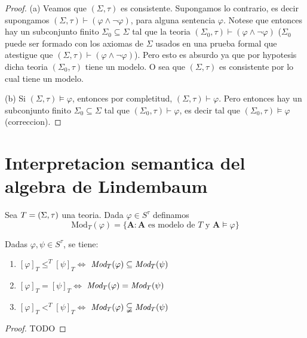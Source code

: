 \begin{proof}
  (a) Veamos que $(\Sigma ,\tau )$ es consistente. Supongamos lo contrario, es
decir supongamos $(\Sigma ,\tau )\vdash \left( \varphi \wedge \lnot \varphi
\right) $, para alguna sentencia $\varphi $. Notese que entonces hay un
subconjunto finito $\Sigma _{0}\subseteq \Sigma $ tal que la teoria $(\Sigma
_{0},\tau )\vdash \left( \varphi \wedge \lnot \varphi \right) $ ($\Sigma
_{0} $ puede ser formado con los axiomas de $\Sigma $ usados en una prueba
formal que atestigue que $(\Sigma ,\tau )\vdash \left( \varphi \wedge \lnot
\varphi \right) $). Pero esto es absurdo ya que por hypotesis dicha teoria $%
(\Sigma _{0},\tau )$ tiene un modelo. O sea que $(\Sigma ,\tau )$ es
consistente por lo cual tiene un modelo.

(b) Si $(\Sigma ,\tau )\models \varphi $, entonces por completitud, $(\Sigma
,\tau )\vdash \varphi $. Pero entonces hay un subconjunto finito $\Sigma
_{0}\subseteq \Sigma $ tal que $(\Sigma _{0},\tau )\vdash \varphi $, es
decir tal que $(\Sigma _{0},\tau )\models \varphi $ (correccion).
\end{proof}

\section{Interpretacion semantica del algebra de Lindembaum}
\begin{definition}
  Sea $T=(\Sigma,\tau)$ una teoria. Dada $\varphi\in S^\tau$ definamos
  $$
  \text{Mod}_T(\varphi)=\{\mathbf{A}:\mathbf{A} \text{ es modelo de } T \text{ y } \mathbf{A}\models\varphi\}
  $$
\end{definition}

\begin{lemma}
  Dadas $\varphi,\psi \in S^\tau$, se tiene:\begin{enumerate}
    \item $[\varphi]_T\leq^T[\psi]_T\iff$ $\emph{Mod}_T(\varphi)\subseteq\emph{Mod}_T(\psi)$
    \item $[\varphi]_T=[\psi]_T\iff$ $\emph{Mod}_T(\varphi)=\emph{Mod}_T(\psi)$
    \item $[\varphi]_T<^T[\psi]_T\iff$ $\emph{Mod}_T(\varphi)\subsetneqq\emph{Mod}_T(\psi)$
  \end{enumerate}
\end{lemma}
\begin{proof}
  TODO
\end{proof}